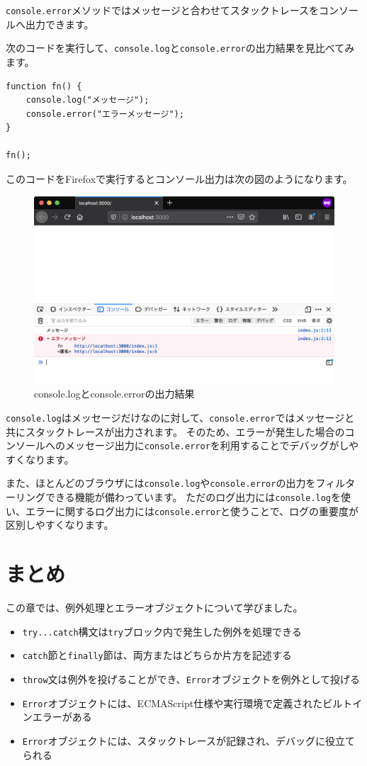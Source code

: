 \texttt{console.error}メソッドではメッセージと合わせてスタックトレースをコンソールへ出力できます。

次のコードを実行して、\texttt{console.log}と\texttt{console.error}の出力結果を見比べてみます。

\begin{lstlisting}
function fn() {
    console.log("メッセージ");
    console.error("エラーメッセージ");
}

fn();
\end{lstlisting}

このコードをFirefoxで実行するとコンソール出力は次の図のようになります。

\begin{figure}[h]
\centering
\includegraphics[width=120mm]{./fig/console-error.png}
\caption{console.logとconsole.errorの出力結果}
\end{figure}

\texttt{console.log}はメッセージだけなのに対して、\texttt{console.error}ではメッセージと共にスタックトレースが出力されます。
そのため、エラーが発生した場合のコンソールへのメッセージ出力に\texttt{console.error}を利用することでデバッグがしやすくなります。

また、ほとんどのブラウザには\texttt{console.log}や\texttt{console.error}の出力をフィルターリングできる機能が備わっています。
ただのログ出力には\texttt{console.log}を使い、エラーに関するログ出力には\texttt{console.error}と使うことで、ログの重要度が区別しやすくなります。

\hypertarget{conclusion}{%
\section{まとめ}\label{conclusion}}

この章では、例外処理とエラーオブジェクトについて学びました。

\begin{itemize}
\item
  \texttt{try...catch}構文は\texttt{try}ブロック内で発生した例外を処理できる
\item
  \texttt{catch}節と\texttt{finally}節は、両方またはどちらか片方を記述する
\item
  \texttt{throw}文は例外を投げることができ、\texttt{Error}オブジェクトを例外として投げる
\item
  \texttt{Error}オブジェクトには、ECMAScript仕様や実行環境で定義されたビルトインエラーがある
\item
  \texttt{Error}オブジェクトには、スタックトレースが記録され、デバッグに役立てられる
\end{itemize}

